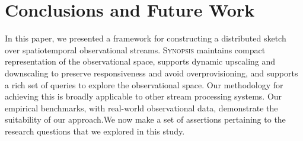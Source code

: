 \section{Conclusions and Future Work}
\label{sec:conclusions}
In this paper, we presented a framework for constructing a distributed sketch over spatiotemporal observational streams. \textsc{Synopsis} maintains compact representation of the observational space, supports dynamic upscaling and downscaling to preserve responsiveness and avoid overprovisioning, and supports a rich set of queries to explore the observational space. Our methodology for achieving this is broadly applicable to other stream processing systems.  Our empirical benchmarks, with real-world observational data, demonstrate the suitability of our approach.We now make a set of assertions pertaining to the research questions that we explored in this study.

